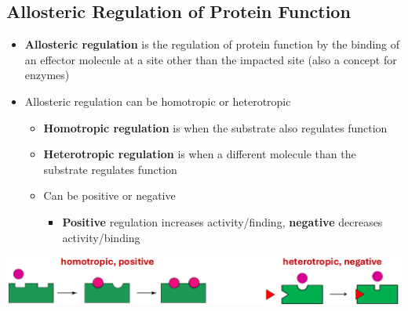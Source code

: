 \documentclass[10pt]{article}
\begin{document}
\subsection*{Allosteric Regulation of Protein Function}
\begin{itemize}
    \item \textbf{Allosteric regulation} is the regulation of protein function by the binding of an effector molecule at a site other than the impacted site (also a concept for enzymes)
    \item Allosteric regulation can be homotropic or heterotropic
    \begin{itemize}
        \item \textbf{Homotropic regulation} is when the substrate also regulates function
        \item \textbf{Heterotropic regulation} is when a different molecule than the substrate regulates function
        \item Can be positive or negative
        \begin{itemize}
            \item \textbf{Positive} regulation increases activity/finding, \textbf{negative} decreases activity/binding
        \end{itemize}
    \end{itemize}
\end{itemize}
\begin{center}
    \includegraphics*[width=\textwidth]{L3_16.png}
\end{center}
\end{document}
